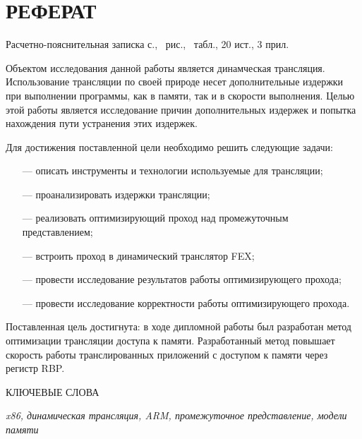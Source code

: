 \section*{РЕФЕРАТ}

Расчетно-пояснительная записка \pageref{LastPage} с., \totalfigures\ рис., \totaltables\ табл., 20 ист., 3 прил.

Объектом исследования данной работы является динамческая трансляция. Использование трансляции по своей природе несет дополнительные издержки при выполнении программы, как в памяти, так и в скорости выполнения. Целью этой работы является исследование причин дополнительных издержек и попытка нахождения пути устранения этих издержек.

Для достижения поставленной цели необходимо решить следующие задачи:

\begin{itemize}[leftmargin=1.6\parindent]
	\item [---] описать инструменты и технологии используемые для трансляции;
	\item [---] проанализировать издержки трансляции;
	\item [---] реализовать оптимизирующий проход над промежуточным представлением;
	\item [---] встроить проход в динамический транслятор FEX;
	\item [---] провести исследование результатов работы оптимизирующего прохода;
	\item [---] провести исследование корректности работы оптимизирующего прохода.
\end{itemize}

Поставленная цель достигнута: в ходе дипломной работы был разработан метод оптимизации трансляции доступа к памяти. Разработанный метод повышает скорость работы транслированных приложений с доступом к памяти через регистр RBP.

КЛЮЧЕВЫЕ СЛОВА

\textit{x86, динамическая трансляция, ARM, промежуточное представление, модели памяти}

\pagebreak